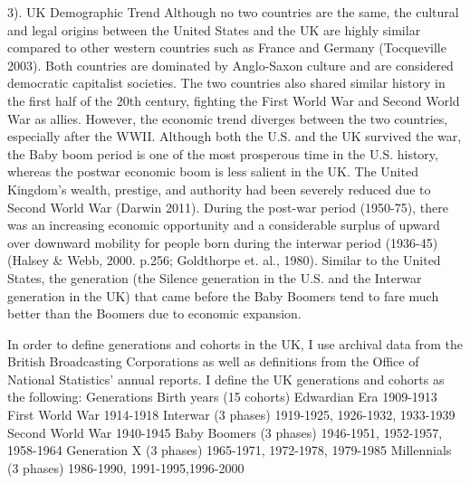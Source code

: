 3). UK Demographic Trend
Although no two countries are the same, the cultural and legal origins between the United States and the UK are highly similar compared to other western countries such as France and Germany (Tocqueville 2003). Both countries are dominated by Anglo-Saxon culture and are considered democratic capitalist societies. The two countries also shared similar history in the first half of the 20th century, fighting the First World War and Second World War as allies. However, the economic trend diverges between the two countries, especially after the WWII. Although both the U.S. and the UK survived the war, the Baby boom period is one of the most prosperous time in the U.S. history, whereas the postwar economic boom is less salient in the UK. The United Kingdom’s wealth, prestige, and authority had been severely reduced due to Second World War (Darwin 2011). During the post-war period (1950-75), there was an increasing economic opportunity and a considerable surplus of upward over downward mobility for people born during the interwar period (1936-45) (Halsey & Webb, 2000. p.256; Goldthorpe et. al., 1980). Similar to the United States, the generation (the Silence generation in the U.S. and the Interwar generation in the UK) that came before the Baby Boomers tend to fare much better than the Boomers due to economic expansion.

In order to define generations and cohorts in the UK, I use archival data from the British Broadcasting Corporations as well as definitions from the Office of National Statistics’ annual reports. I define the UK generations and cohorts as the following:
Generations
Birth years (15 cohorts)
Edwardian Era
1909-1913
First World War
1914-1918
Interwar (3 phases)
1919-1925, 1926-1932, 1933-1939
Second World War
1940-1945
Baby Boomers (3 phases)
1946-1951, 1952-1957, 1958-1964
Generation X (3 phases)
1965-1971, 1972-1978, 1979-1985
Millennials (3 phases)
1986-1990, 1991-1995,1996-2000

